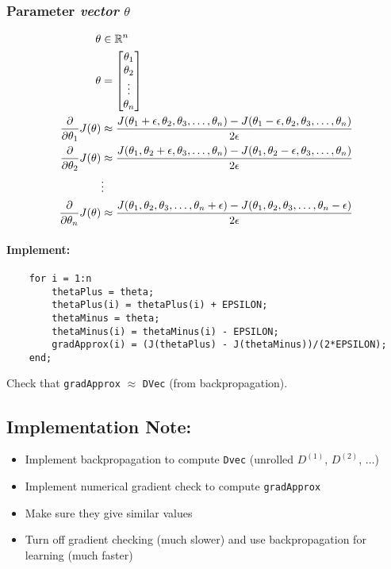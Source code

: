 \subsubsection*{Parameter \emph{vector} $\theta$}
\begin{align*}
	\theta                                     & \in \mathbb{R}^n                     \\
	\theta                                     & = \begin{bmatrix}
		\theta_1 \\
		\theta_2 \\
		\vdots   \\
		\theta_n \\
	\end{bmatrix} \\
	\frac{\partial}{\partial\theta_1}J(\theta) & \approx
	\frac{J(\theta_1 + \epsilon, \theta_2, \theta_3, \dots, \theta_n) -
		J(\theta_1 - \epsilon, \theta_2, \theta_3, \dots, \theta_n)}{2\epsilon}   \\
	\frac{\partial}{\partial\theta_2}J(\theta) & \approx
	\frac{J(\theta_1, \theta_2 + \epsilon, \theta_3, \dots, \theta_n) -
		J(\theta_1, \theta_2 - \epsilon, \theta_3, \dots, \theta_n)}{2\epsilon}   \\
	                                           & \vdots                       \\
	\frac{\partial}{\partial\theta_n}J(\theta) & \approx
	\frac{J(\theta_1, \theta_2, \theta_3, \dots, \theta_n + \epsilon) -
		J(\theta_1, \theta_2, \theta_3, \dots, \theta_n - \epsilon)}{2\epsilon}   \\
\end{align*}
\paragraph{Implement:}
\begin{verbatim}
	for i = 1:n
		thetaPlus = theta;
		thetaPlus(i) = thetaPlus(i) + EPSILON;
		thetaMinus = theta;
		thetaMinus(i) = thetaMinus(i) - EPSILON;
		gradApprox(i) = (J(thetaPlus) - J(thetaMinus))/(2*EPSILON);
	end;
\end{verbatim}

Check that \texttt{gradApprox} $\approx$ \texttt{DVec} (from
backpropagation).

\subsection{Implementation Note:}
\begin{itemize}
	\item Implement backpropagation to compute \texttt{Dvec} (unrolled
	      $D^{(1)}$, $D^{(2)}$, $\dots$)
	\item Implement numerical gradient check to compute \texttt{gradApprox}
	\item Make sure they give similar values
	\item Turn off gradient checking (much slower) and use backpropagation for learning
	      (much faster)
\end{itemize}

